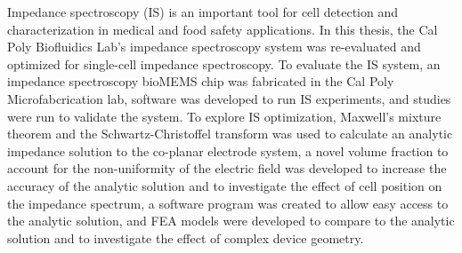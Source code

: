 
\par Impedance spectroscopy (IS) is an important tool for cell detection and characterization in medical and food safety applications. In this thesis, the Cal Poly Biofluidics Lab's impedance spectroscopy system was re-evaluated and optimized for single-cell impedance spectroscopy. To evaluate the IS system, an impedance spectroscopy bioMEMS chip was fabricated in the Cal Poly Microfabcrication lab, software was developed to run IS experiments, and studies were run to validate the system. To explore IS optimization, Maxwell's mixture theorem and the Schwartz-Christoffel transform was used to calculate an analytic impedance solution to the co-planar electrode system, a novel volume fraction to account for the non-uniformity of the electric field was developed to increase the accuracy of the analytic solution and to investigate the effect of cell position on the impedance spectrum, a software program was created to allow easy access to the analytic solution, and FEA models were developed to compare to the analytic solution and to investigate the effect of complex device geometry.




